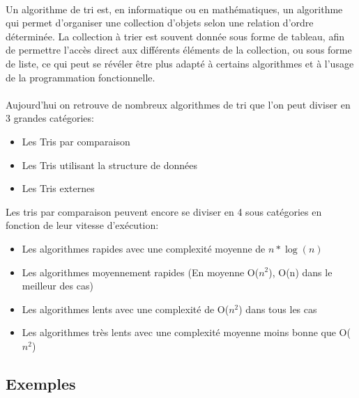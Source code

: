 \documentclass[11pt,a4paper]{article}
\begin{document}
\paragraph{}
Un algorithme de tri est, en informatique ou en mathématiques, un algorithme qui permet d'organiser une collection d'objets
selon une relation d'ordre déterminée.
\newline
La collection à trier est souvent donnée sous forme de tableau, afin de permettre l'accès direct aux différents éléments de la collection,
ou sous forme de liste, ce qui peut se révéler être plus adapté à certains algorithmes et à l'usage de la programmation fonctionnelle.\\

\paragraph{}
Aujourd'hui on retrouve de nombreux algorithmes de tri que l'on peut diviser en 3 grandes catégories:
\begin{itemize}
    \item Les Tris par comparaison
    \item Les Tris utilisant la structure de données
    \item Les Tris externes
\end{itemize}
\vspace{0.5cm}
Les tris par comparaison peuvent encore se diviser en 4 sous catégories en fonction de leur vitesse d'exécution:

\vspace{0.2cm}
\begin{itemize}
    \item Les algorithmes rapides avec une complexité moyenne de $n*\log(n)$
    \item Les algorithmes moyennement rapides (En moyenne O($n^2$), O(n) dans le meilleur des cas)
    \item Les algorithmes lents avec une complexité de O($n^2$) dans tous les cas
    \item Les algorithmes très lents avec une complexité moyenne moins bonne que O($n^2$)
\end{itemize}

\subsection{Exemples}
\end{document}
